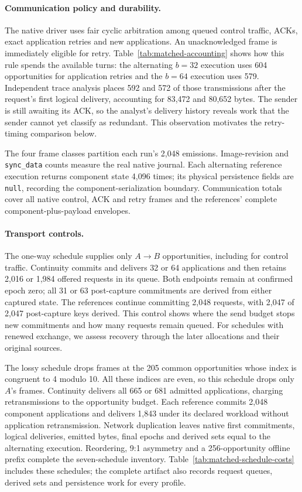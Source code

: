\documentclass[pdflatex]{sn-jnl}
\theoremstyle{thmstyleone}
\theoremstyle{thmstylethree}
\theoremstyle{thmstyletwo}
\begin{document}
\paragraph{Communication policy and durability.}
The native driver uses fair cyclic arbitration among queued control traffic,
ACKs, exact application retries and new applications. An unacknowledged frame
is immediately eligible for retry. Table~\ref{tab:matched-accounting} shows
how this rule spends the available turns: the alternating $b=32$ execution
uses 604 opportunities for application retries and the $b=64$ execution
uses 579. Independent trace analysis places 592 and 572 of those
transmissions after the request's first logical delivery, accounting for
83,472 and 80,652 bytes. The sender is still awaiting its ACK, so the
analyst's delivery history reveals work that the sender cannot yet classify
as redundant. This observation motivates the retry-timing comparison below.

The four frame classes partition each run's 2,048 emissions. Image-revision
and \texttt{sync\_data} counts measure the real native journal. Each
alternating reference execution returns component state 4,096 times;
its physical persistence fields are \texttt{null}, recording the
component-serialization boundary. Communication totals cover all native
control, ACK and retry frames and the references' complete
component-plus-payload envelopes.

\paragraph{Transport controls.}
The one-way schedule supplies only $A\!\to\!B$ opportunities, including for
control traffic. Continuity commits and delivers 32 or 64 applications and
then retains 2,016 or 1,984 offered requests in its queue. Both endpoints
remain at confirmed epoch zero; all 31 or 63 post-capture commitments are
derived from either captured state. The references continue committing
2,048 requests, with 2,047 of 2,047 post-capture keys derived. This control
shows where the send budget stops new commitments and how many requests
remain queued. For schedules with renewed exchange, we assess recovery
through the later allocations and their original sources.

The lossy schedule drops frames at the 205 common opportunities whose index is
congruent to 4 modulo 10. All these indices are even, so this schedule
drops only $A$'s frames. Continuity delivers all 665 or 681 admitted
applications, charging retransmissions to the opportunity budget. Each
reference commits 2,048 component applications and delivers 1,843 under its
declared workload without application retransmission. Network duplication
leaves native first commitments, logical deliveries, emitted bytes, final
epochs and derived sets equal to the alternating execution. Reordering, 9:1
asymmetry and a 256-opportunity offline prefix complete the seven-schedule
inventory. Table~\ref{tab:matched-schedule-costs} includes these schedules;
the complete artifact also records request queues, derived sets and
persistence work for every profile.
\end{document}
